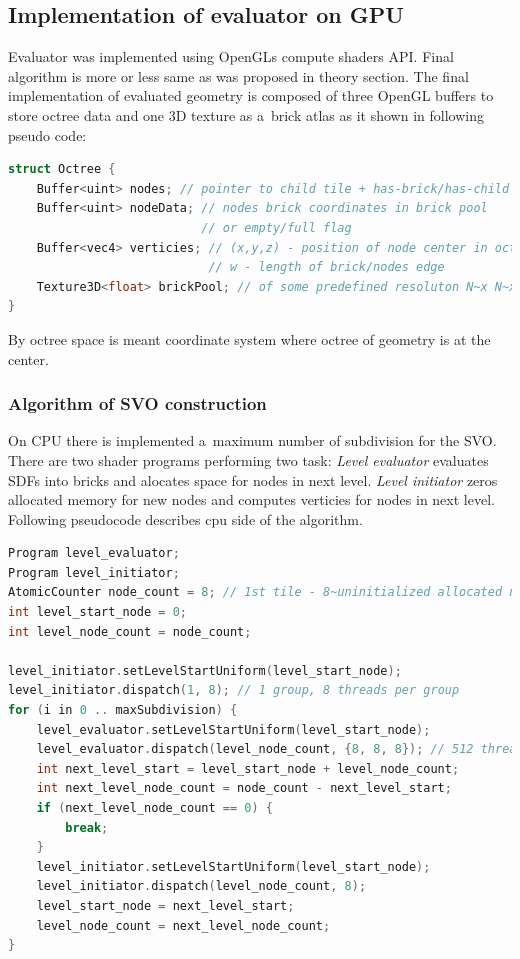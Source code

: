 \documentclass[11pt, a4paper]{article}
\begin{document}
\subsection{Implementation of evaluator on GPU}
Evaluator was implemented using OpenGLs compute shaders API.
Final algorithm is more or less same as was proposed in theory section.
The final implementation of evaluated geometry is composed of three OpenGL buffers to store octree data and one 3D texture as a~brick atlas as it shown in following pseudo code:
\begin{lstlisting}[language=C++]
struct Octree {
    Buffer<uint> nodes; // pointer to child tile + has-brick/has-child flags
    Buffer<uint> nodeData; // nodes brick coordinates in brick pool
                           // or empty/full flag
    Buffer<vec4> verticies; // (x,y,z) - position of node center in octree space
                            // w - length of brick/nodes edge
    Texture3D<float> brickPool; // of some predefined resoluton N~x N~x N~voxels
}
\end{lstlisting}
By octree space is meant coordinate system where octree of geometry is at the center.

\subsubsection{Algorithm of SVO construction}
On CPU there is implemented a~maximum number of subdivision for the SVO.
There are two shader programs performing two task: \emph{Level evaluator} evaluates SDFs into bricks and alocates space for nodes in next level.
\emph{Level initiator} zeros allocated memory for new nodes and computes verticies for nodes in next level.
Following pseudocode describes cpu side of the algorithm.

\begin{lstlisting}[language=C++]
Program level_evaluator;
Program level_initiator;
AtomicCounter node_count = 8; // 1st tile - 8~uninitialized allocated nodes
int level_start_node = 0;
int level_node_count = node_count;

level_initiator.setLevelStartUniform(level_start_node);
level_initiator.dispatch(1, 8); // 1 group, 8 threads per group
for (i in 0 .. maxSubdivision) {
    level_evaluator.setLevelStartUniform(level_start_node);
    level_evaluator.dispatch(level_node_count, {8, 8, 8}); // 512 threads
    int next_level_start = level_start_node + level_node_count;
    int next_level_node_count = node_count - next_level_start;
    if (next_level_node_count == 0) {
        break;
    }
    level_initiator.setLevelStartUniform(level_start_node);
    level_initiator.dispatch(level_node_count, 8);
    level_start_node = next_level_start;
    level_node_count = next_level_node_count;
}
\end{lstlisting}
\end{document}
